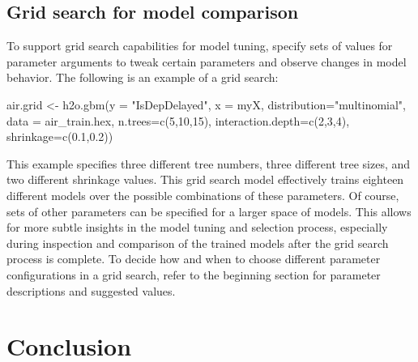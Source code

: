 \documentclass{article}[11pt]
\begin{document}
{\subsection{Grid search for model comparison} 

To support grid search capabilities for model tuning,  specify sets of values for parameter arguments to tweak certain parameters and observe changes in model behavior. The following is an example of a grid search:

\begin{spverbatim}

air.grid <- h2o.gbm(y = "IsDepDelayed", x = myX, 
                   distribution="multinomial", 
                   data = air_train.hex, n.trees=c(5,10,15), 
                   interaction.depth=c(2,3,4), 
                   shrinkage=c(0.1,0.2))

\end{spverbatim}
\noindent
This example specifies three different tree numbers, three different tree sizes, and two different shrinkage values. This grid search model effectively trains eighteen different models over the possible combinations of these parameters. Of course, sets of other parameters can be specified for a larger space of models. This allows for more subtle insights in the model tuning and selection process, especially during inspection and comparison of the trained models after the grid search process is complete. To decide how and when to choose different parameter configurations in a grid search, refer to the beginning section for parameter descriptions and suggested values.


\section{Conclusion}

}
\end{document}
